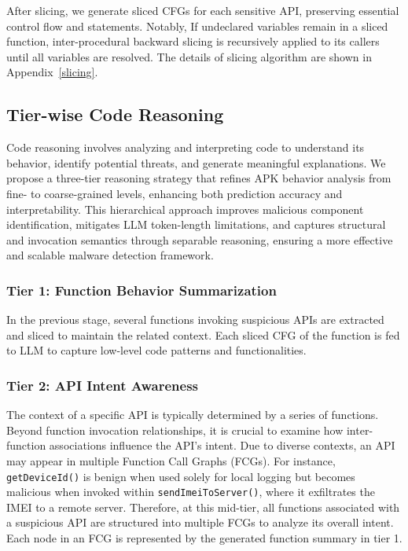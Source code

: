 After slicing, we generate sliced CFGs for each sensitive API, preserving essential control flow and statements. Notably, If undeclared variables remain in a sliced function, inter-procedural backward slicing is recursively applied to its callers until all variables are resolved. The details of slicing algorithm are shown in Appendix~\ref{slicing}.

\subsection{Tier-wise Code Reasoning}
Code reasoning involves analyzing and interpreting code to understand its behavior, identify potential threats, and generate meaningful explanations. We propose a three-tier reasoning strategy that refines APK behavior analysis from fine- to coarse-grained levels, enhancing both prediction accuracy and interpretability. This hierarchical approach improves malicious component identification, mitigates LLM token-length limitations, and captures structural and invocation semantics through separable reasoning, ensuring a more effective and scalable malware detection framework.




\subsubsection{Tier 1: Function Behavior Summarization}
In the previous stage, several functions invoking suspicious APIs are extracted and sliced to maintain the related context. Each sliced CFG of the function is fed to LLM to capture low-level code patterns and functionalities. 



\subsubsection{Tier 2: API Intent Awareness}
The context of a specific API is typically determined by a series of functions. Beyond function invocation relationships, it is crucial to examine how inter-function associations influence the API's intent. Due to diverse contexts, an API may appear in multiple Function Call Graphs (FCGs). For instance, \verb|getDeviceId()| is benign when used solely for local logging but becomes malicious when invoked within \verb|sendImeiToServer()|, where it exfiltrates the IMEI to a remote server. Therefore, at this mid-tier, all functions associated with a suspicious API are structured into multiple FCGs to analyze its overall intent. Each node in an FCG is represented by the generated function summary in tier 1. 

